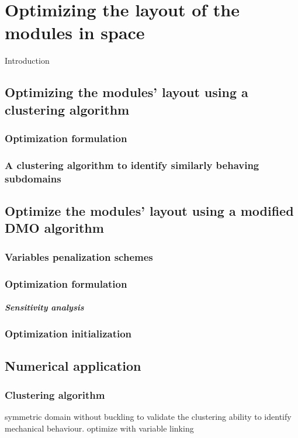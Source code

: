 \setchapterpreamble[u]{\margintoc}
\glsresetall %
\chapter{Optimizing the layout of the modules in space}
Introduction
\section{Optimizing the modules' layout using a clustering algorithm}

\subsection{Optimization formulation}

\subsection{A clustering algorithm to identify similarly behaving subdomains}

\section{Optimize the modules' layout using a modified DMO algorithm}

\subsection{Variables penalization schemes}

\subsection{Optimization formulation}

\paragraph{Sensitivity analysis}

\subsection{Optimization initialization}

\section{Numerical application}

\subsection{Clustering algorithm}
symmetric domain without buckling to validate the clustering ability to identify mechanical behaviour. optimize with variable linking


